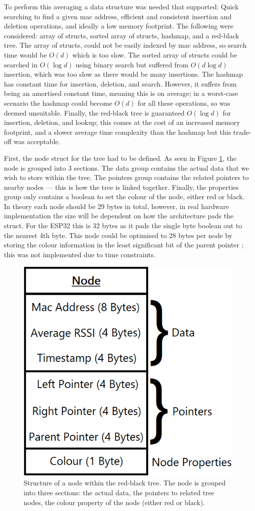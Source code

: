 \documentclass{l4proj}
\begin{document}
To perform this averaging a data structure was needed that supported: Quick searching to find a given mac address, efficient and consistent insertion and deletion operations, and ideally a low memory footprint. The following were considered: array of structs, sorted array of structs, hashmap, and a red-black tree. The array of structs, could not be easily indexed by mac address, so search time would be $O(d)$ which is too slow. The sorted array of structs could be searched in $O(\log{d})$ using binary search but suffered from $O(d\log{d})$ insertion, which was too slow as there would be many insertions. The hashmap has constant time for insertion, deletion, and search. However, it suffers from being an amortised constant time, meaning this is on average; in a worst-case scenario the hashmap could become $O(d)$ for all these operations, so was deemed unsuitable. Finally, the red-black tree is guaranteed $O(\log{d})$ for insertion, deletion, and lookup; this comes at the cost of an increased memory footprint, and a slower average time complexity than the hashmap but this trade-off was acceptable.

First, the node struct for the tree had to be defined. As seen in Figure \ref{fig:tree_node}, the node is grouped into 3 sections. The data group contains the actual data that we wish to store within the tree. The pointers group contains the related pointers to nearby nodes — this is how the tree is linked together. Finally, the properties group only contains a boolean to set the colour of the node, either red or black. In theory each node should be 29 bytes in total, however, in real hardware implementation the size will be dependent on how the architecture pads the struct. For the ESP32 this is 32 bytes as it pads the single byte boolean out to the nearest 4th byte. This node could be optimised to 28 bytes per node by storing the colour information in the least significant bit of the parent pointer \citep{munoz_bannalia_2008}; this was not implemented due to time constraints.

\begin{figure}[!htb]
    \centering
    \includegraphics[width=0.4\linewidth]{images/rbtree_node.png}

    \caption{ Structure of a node within the red-black tree. The node is grouped into three sections: the actual data, the pointers to related tree nodes, the colour property of the node (either red or black). }

    \label{fig:tree_node}
\end{figure}
\end{document}
